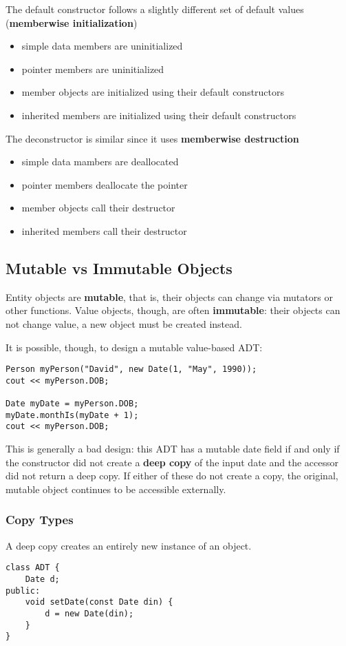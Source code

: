 \documentclass[12pt]{article}
\begin{document}
The default constructor follows a slightly different set of default values ({\bf memberwise initialization})
\begin{itemize}
\item simple data members are uninitialized
\item pointer members are uninitialized
\item member objects are initialized using their default constructors
\item inherited members are initialized using their default constructors
\end{itemize}

The deconstructor is similar since it uses {\bf memberwise destruction}
\begin{itemize}
\item simple data mambers are deallocated
\item pointer members deallocate the pointer
\item member objects call their destructor
\item inherited members call their destructor
\end{itemize}

\subsection{Mutable vs Immutable Objects}
Entity objects are {\bf mutable}, that is, their objects can change via mutators or other functions. Value objects, though, are often {\bf immutable}: their objects can not change value, a new object must be created instead.

It is possible, though, to design a mutable value-based ADT:\@
\begin{lstlisting}
Person myPerson("David", new Date(1, "May", 1990));
cout << myPerson.DOB;

Date myDate = myPerson.DOB;
myDate.monthIs(myDate + 1);
cout << myPerson.DOB;
\end{lstlisting}
This is generally a bad design: this ADT has a mutable date field if and only if the constructor did not create a {\bf deep copy} of the input date and the accessor did not return a deep copy. If either of these do not create a copy, the original, mutable object continues to be accessible externally.

\subsubsection{Copy Types}
A deep copy creates an entirely new instance of an object.
\begin{lstlisting}
class ADT {
    Date d;
public:
    void setDate(const Date din) {
        d = new Date(din);
    }
}
\end{lstlisting}
\end{document}
